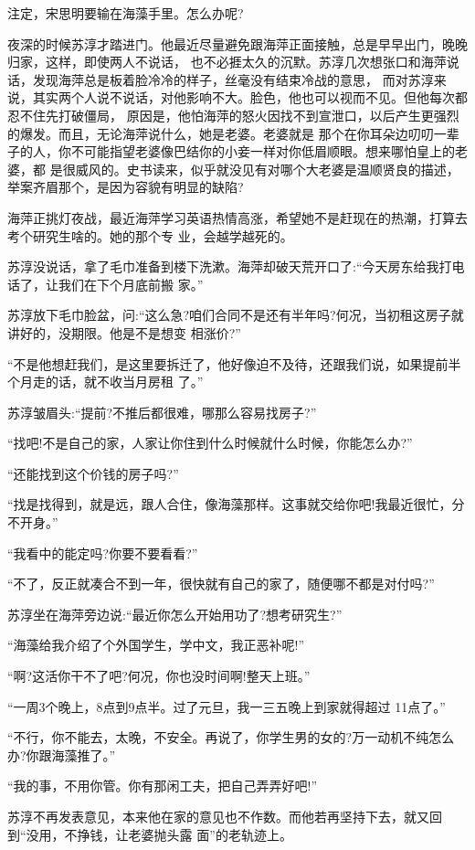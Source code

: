 \documentclass[11pt,a4paper,onecolumn]{article}
\begin{document}
注定，宋思明要输在海藻手里。怎么办呢?

夜深的时候苏淳才踏进门。他最近尽量避免跟海萍正面接触，总是早早出门，晚晚归家，这样，即使两人不说话，
也不必捱太久的沉默。苏淳几次想张口和海萍说话，发现海萍总是板着脸冷冷的样子，丝毫没有结束冷战的意思，
而对苏淳来说，其实两个人说不说话，对他影响不大。脸色，他也可以视而不见。但他每次都忍不住先打破僵局，
原因是，他怕海萍的怒火因找不到宣泄口，以后产生更强烈的爆发。而且，无论海萍说什么，她是老婆。老婆就是
那个在你耳朵边叨叨一辈子的人，你不可能指望老婆像巴结你的小妾一样对你低眉顺眼。想来哪怕皇上的老婆，都
是很威风的。史书读来，似乎就没见有对哪个大老婆是温顺贤良的描述，举案齐眉那个，是因为容貌有明显的缺陷?

海萍正挑灯夜战，最近海萍学习英语热情高涨，希望她不是赶现在的热潮，打算去考个研究生啥的。她的那个专
业，会越学越死的。

苏淳没说话，拿了毛巾准备到楼下洗漱。海萍却破天荒开口了:``今天房东给我打电话了，让我们在下个月底前搬
家。''

苏淳放下毛巾脸盆，问:``这么急?咱们合同不是还有半年吗?何况，当初租这房子就讲好的，没期限。他是不是想变
相涨价?''

``不是他想赶我们，是这里要拆迁了，他好像迫不及待，还跟我们说，如果提前半个月走的话，就不收当月房租
了。''

苏淳皱眉头:``提前?不推后都很难，哪那么容易找房子?''

``找吧!不是自己的家，人家让你住到什么时候就什么时候，你能怎么办?''

``还能找到这个价钱的房子吗?''

``找是找得到，就是远，跟人合住，像海藻那样。这事就交给你吧!我最近很忙，分不开身。''

``我看中的能定吗?你要不要看看?''

``不了，反正就凑合不到一年，很快就有自己的家了，随便哪不都是对付吗?''

苏淳坐在海萍旁边说:``最近你怎么开始用功了?想考研究生?''

``海藻给我介绍了个外国学生，学中文，我正恶补呢!''

``啊?这活你干不了吧?何况，你也没时间啊!整天上班。''

``一周3个晚上，8点到9点半。过了元旦，我一三五晚上到家就得超过 11点了。''

``不行，你不能去，太晚，不安全。再说了，你学生男的女的?万一动机不纯怎么办?你跟海藻推了。''

``我的事，不用你管。你有那闲工夫，把自己弄弄好吧!''

苏淳不再发表意见，本来他在家的意见也不作数。而他若再坚持下去，就又回到``没用，不挣钱，让老婆抛头露
面''的老轨迹上。
\end{document}
